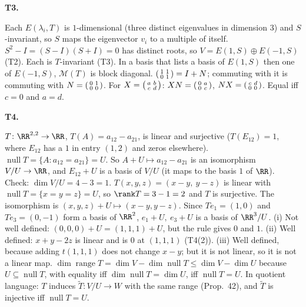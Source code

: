 \documentclass[10pt]{scrartcl}
\DeclareMathOperator{\nul}{null}
\DeclareMathOperator{\range}{range}
\newcommand{\MM}{\mathcal M}
\begin{document}
\textbf{T3.}
\begin{enumerate}[(a)]
  \ii Each $E(\lambda_i,T)$ is $1$-dimensional (three distinct eigenvalues in dimension $3$) and $S$-invariant, so $S$ maps the eigenvector $v_i$ to a multiple of itself.
  \ii $S^2-I=(S-I)(S+I)=0$ has distinct roots, so $V=E(1,S)\oplus E(-1,S)$ (T2). Each is $T$-invariant (T3). In a basis that lists a basis of $E(1,S)$ then one of $E(-1,S)$, $\MM(T)$ is block diagonal.
  \ii $\begin{psmallmatrix}1&1\\0&1\end{psmallmatrix}=I+N$; commuting with it is commuting with $N=\begin{psmallmatrix}0&1\\0&0\end{psmallmatrix}$. For $X=\begin{psmallmatrix}a&b\\c&d\end{psmallmatrix}$: $XN=\begin{psmallmatrix}0&a\\0&c\end{psmallmatrix}$, $NX=\begin{psmallmatrix}c&d\\0&0\end{psmallmatrix}$. Equal iff $c=0$ and $a=d$.
\end{enumerate}

\textbf{T4.}
\begin{enumerate}[(a)]
  \ii $T\colon\RR^{2,2}\to\RR$, $T(A)=a_{12}-a_{21}$, is linear and surjective ($T(E_{12})=1$, where $E_{12}$ has a $1$ in entry $(1,2)$ and zeros elsewhere). $\nul T=\{A:a_{12}=a_{21}\}=U$. So $A+U\mapsto a_{12}-a_{21}$ is an isomorphism $V/U\to\RR$, and $E_{12}+U$ is a basis of $V/U$ (it maps to the basis $1$ of $\RR$). Check: $\dim V/U=4-3=1$.
  \ii $T(x,y,z)=(x-y,\ y-z)$ is linear with $\nul T=\{x=y=z\}=U$, so $\rank T=3-1=2$ and $T$ is surjective. The isomorphism is $(x,y,z)+U\mapsto(x-y,y-z)$. Since $Te_1=(1,0)$ and $Te_3=(0,-1)$ form a basis of $\RR^2$, $e_1+U,\ e_3+U$ is a basis of $\RR^3/U$.
  \ii (i) Not well defined: $(0,0,0)+U=(1,1,1)+U$, but the rule gives $0$ and $1$. (ii) Well defined: $x+y-2z$ is linear and is $0$ at $(1,1,1)$ (T4(2)). (iii) Well defined, because adding $t(1,1,1)$ does not change $x-y$; but it is not linear, so it is not a linear map.
  \ii $\dim\range T=\dim V-\dim\nul T\le\dim V-\dim U$ because $U\subseteq\nul T$, with equality iff $\dim\nul T=\dim U$, iff $\nul T=U$. In quotient language: $T$ induces $\tilde T\colon V/U\to W$ with the same range (Prop.~42), and $\tilde T$ is injective iff $\nul T=U$.
\end{enumerate}
\end{document}
